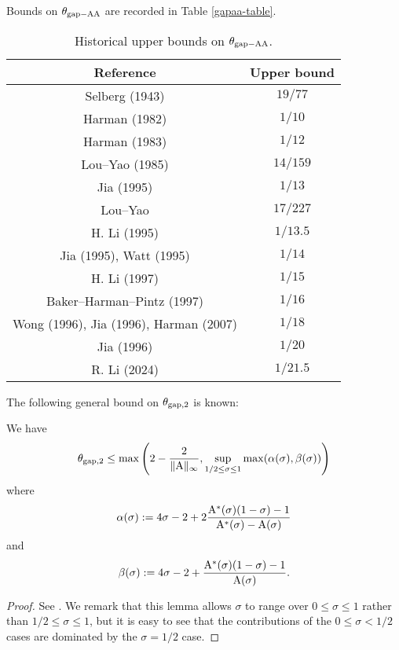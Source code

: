 Bounds on $\theta_{\mathrm{gap-AA}}$ are recorded in Table \ref{gapaa-table}.

\begin{table}[ht]
    \caption{Historical upper bounds on $\theta_{\mathrm{gap-AA}}$.}
    \centering
    \renewcommand{\arraystretch}{1.2}
    \begin{tabular}{|c|c|}
    \hline
    Reference & Upper bound \\
    \hline
    Selberg (1943) \cite{selberg_1943} & $19/77$\\
    \hline
    Harman (1982) & $1/10$ \\
    \hline
    Harman (1983)  & $1/12$ \\
    \hline
    Lou--Yao (1985) & $14/159$ \\
    \hline
    Jia (1995) & $1/13$ \\
    \hline
    Lou--Yao & $17/227$ \\
    \hline
    H. Li (1995) & $1/13.5$ \\
    \hline
    Jia (1995), Watt (1995) & $1/14$ \\
    \hline
    H. Li (1997) & $1/15$ \\
    \hline
    Baker--Harman--Pintz (1997) & $1/16$ \\
    \hline
    Wong (1996), Jia (1996), Harman (2007) & $1/18$ \\
    \hline
    Jia (1996) & $1/20$ \\
    \hline
    R. Li (2024) & $1/21.5$ \\
    \hline
    \end{tabular}
    \end{table}\label{gapaa-table}



The following general bound on $\theta_{\mathrm{gap},2}$ is known:

\begin{proposition}\label{gapsquare-from-a}
    We have
    $$ \theta_{\mathrm{gap},2} \leq \max\left( 2-\frac{2}{\|\mathrm{A}\|_\infty}, \sup_{1/2 \leq \sigma \leq 1} \max(\alpha(\sigma), \beta(\sigma))\right)$$
    where
    $$ \alpha(\sigma) := 4\sigma-2 + 2 \frac{\mathrm{A}^*(\sigma)(1-\sigma)-1}{\mathrm{A}^*(\sigma)-\mathrm{A}(\sigma)}$$
    and
    $$ \beta(\sigma) := 4\sigma-2 + \frac{\mathrm{A}^*(\sigma)(1-\sigma)-1}{\mathrm{A}(\sigma)}.$$
\end{proposition}

\begin{proof} See \cite[Lemma 2]{heath_brown_consecutive_II}. We remark that this lemma allows $\sigma$ to range over $0 \leq \sigma \leq 1$ rather than $1/2 \leq \sigma \leq 1$, but it is easy to see that the contributions of the $0 \leq \sigma < 1/2$ cases are dominated by the $\sigma=1/2$ case.
\end{proof}

